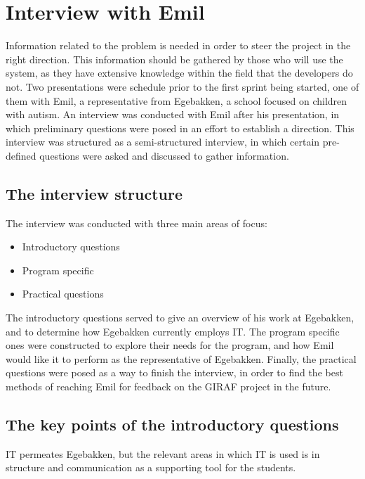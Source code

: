 \section{Interview with Emil}
Information related to the problem is needed in order to steer the project in the right direction.
This information should be gathered by those who will use the system, as they have extensive knowledge within the field that the developers do not.
Two presentations were schedule prior to the first sprint being started, one of them with Emil, a representative from Egebakken, a school focused on children with autism.
An interview was conducted with Emil after his presentation, in which preliminary questions were posed in an effort to establish a direction.
This interview was structured as a semi-structured interview, in which certain pre-defined questions were asked and discussed to gather information.

\subsection{The interview structure}
The interview was conducted with three main areas of focus:
\begin{itemize}
    \item Introductory questions
    \item Program specific
    \item Practical questions 
\end{itemize}
\noindent
The introductory questions served to give an overview of his work at Egebakken, and to determine how Egebakken currently employs IT.
The program specific ones were constructed to explore their needs for the program, and how Emil would like it to perform as the representative of Egebakken.
Finally, the practical questions were posed as a way to finish the interview, in order to find the best methods of reaching Emil for feedback on the GIRAF project in the future.

\subsection{The key points of the introductory questions}
IT permeates Egebakken, but the relevant areas in which IT is used is in structure and communication as a supporting tool for the students.

